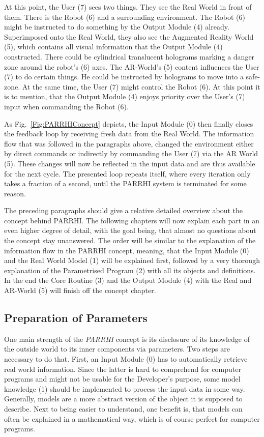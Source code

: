 At this point, the User (7) sees two things. They see the Real World in front of them. There is the Robot (6) and a surrounding environment. The Robot (6) might be instructed to do something by the Output Module (4) already. Superimposed onto the Real World, they also see the Augmented Reality World (5), which contains all visual information that the Output Module (4) constructed. There could be cylindrical translucent holograms marking a danger zone around the robot's (6) axes. The AR-World's (5) content influences the User (7) to do certain things. He could be instructed by holograms to move into a safe-zone. At the same time, the User (7) might control the Robot (6). At this point it is to mention, that the Output Module (4) enjoys priority over the User's (7) input when commanding the Robot (6).

As Fig.~\ref{Fig:PARRHIConcept} depicts, the Input Module (0) then finally closes the feedback loop by receiving fresh data from the Real World. The information flow that was followed in the paragraphs above, changed the environment either by direct commands or indirectly by commanding the User (7) via the AR World (5). These changes will now be reflected in the input data and are thus available for the next cycle. The presented loop repeats itself, where every iteration only takes a fraction of a second, until the PARRHI system is terminated for some reason. 

The preceding paragraphs should give a relative detailed overview about the concept behind PARRHI. The following chapters will now explain each part in an even higher degree of detail, with the goal being, that almost no questions about the concept stay unanswered. The order will be similar to the explanation of the information flow in the PARRHI concept, meaning, that the Input Module (0) and the Real World Model (1) will be explained first, followed by a very thorough explanation of the Parametrised Program (2) with all its objects and definitions. In the end the Core Routine (3) and the Output Module (4) with the Real and AR-World (5) will finish off the concept chapter.


\subsection{Preparation of Parameters}
One main strength of the \textit{PARRHI} concept is its disclosure of its knowledge of the outside world to its inner components via parameters. Two steps are necessary to do that. First, an Input Module (0) has to automatically retrieve real world information. Since the latter is hard to comprehend for computer programs and might not be usable for the Developer's purpose, some model knowledge (1) should be implemented to process the input data in some way. Generally, models are a more abstract version of the object it is supposed to describe. Next to being easier to understand, one benefit is, that models can often be explained in a mathematical way, which is of course perfect for computer programs. 

